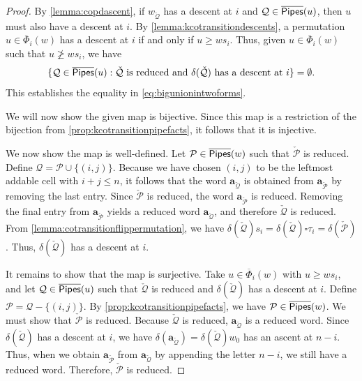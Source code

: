 \documentclass[12 pt]{amsart}
\numberwithin{equation}{section}
\theoremstyle{remark}
\newcommand{\kpipes}{\overline{\sf Pipes}}
\newcommand{\demprod}{\delta}
\newcommand{\kcotransitionperms}{\overline{\Phi}}
\begin{document}
		\begin{proof}			
			By \cref{lemma:copdascent}, if $w_{\check {\mathcal{Q}}}$ has a descent at $i$ and $\mathcal{Q} \in \kpipes(u)$, then $u$ must also have a descent at $i$. 
			By \cref{lemma:kcotransitiondescents}, a permutation $u \in \kcotransitionperms_i(w)$ has a descent at $i$ if and only if $u\geq ws_i$. Thus, given $u \in \kcotransitionperms_i(w)$ such that $u\not \geq ws_i$, we have 
			\[\{\mathcal{Q} \in \kpipes(u):\check {\mathcal{Q}} \text{ is reduced and } \demprod(\check{\mathcal{Q}}) \text{ has a descent at } i\} = \emptyset.\]
			This establishes the equality in \cref{eq:bigunionintwoforms}.
			
			We will now show the given map is bijective.
			Since this map is a restriction of the bijection from \cref{prop:kcotransitionpipefacts}, it follows that it is injective. 
			
			We now show the map is well-defined. 
			Let $\mathcal{P} \in \kpipes(w)$ such that $\check{\mathcal{P}}$ is reduced. 
			Define $\mathcal{Q} = \mathcal{P} \cup \{(i,j)\}$. 
			Because we have chosen $(i,j)$ to be the leftmost addable cell with $i + j\leq n$, it follows that the word
			${\mathbf{a}}_{\check{\mathcal{Q}}}$ is obtained from ${\mathbf{a}}_{\check{\mathcal{P}}}$ by removing the last entry. 
			Since $\check{\mathcal{P}}$ is reduced, the word ${\mathbf{a}}_{\check{\mathcal{P}}}$ is reduced. 
			Removing the final entry from ${\mathbf{a}}_{\check{\mathcal{P}}}$ yields a reduced word ${\mathbf{a}}_{\check{\mathcal{Q}}}$, and therefore $\check{\mathcal{Q}}$ is reduced.
			From \cref{lemma:cotransitionflippermutation}, we have $\demprod(\check{\mathcal{Q}}) s_i = \demprod(\check{\mathcal{Q}})\square \tau_i = \demprod(\check{\mathcal{P}})$. 
			Thus, $\demprod(\check{\mathcal{Q}})$ has a descent at $i$. 
			
			It remains to show that the map is surjective. 
			Take $u \in \kcotransitionperms_i(w)$ with $u\geq ws_i$, and let $\mathcal{Q} \in \kpipes(u)$ such that $\check{\mathcal{Q}}$ is reduced and $\demprod(\check{\mathcal{Q}})$ has a descent at $i$. 
			Define $\mathcal{P} = \mathcal{Q}-\{(i,j)\}$. 
			By \cref{prop:kcotransitionpipefacts}, we have $\mathcal{P} \in \kpipes(w)$.
			We must show that $\check{\mathcal{P}}$ is reduced. 
			Because $\check{\mathcal{Q}}$ is reduced, $\mathbf{a}_{\check{\mathcal{Q}}}$ is a reduced word. 
			Since $\demprod(\check{\mathcal{Q}})$ has a descent at $i$, we have $\demprod(\mathbf{a}_{\check{\mathcal{Q}}}) = \demprod(\check{\mathcal{Q}})w_0$ has an ascent at $n-i$. 
			Thus, when we obtain ${\mathbf{a}}_{\check{\mathcal{P}}}$ from ${\mathbf{a}}_{\check{\mathcal{Q}}}$ by appending the letter $n-i$, we still have a reduced word. 
			Therefore, $\check{\mathcal{P}}$ is reduced.
		\end{proof}
		
\end{document}
